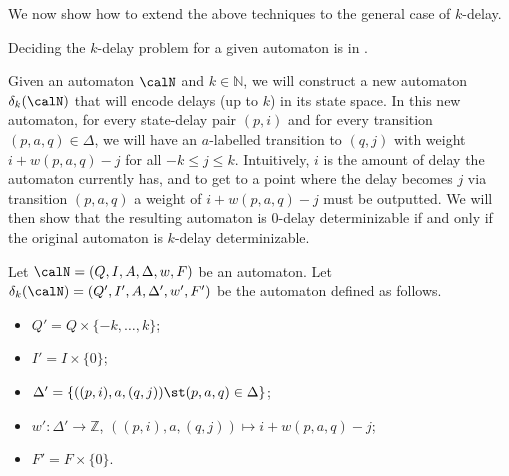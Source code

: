 \documentclass[a4paper]{article}
\begin{document}
We now show how to extend the above techniques to the general case of
$k$-delay.

\begin{theorem}\label{thm:kdelay-in-exp}
	Deciding the $k$-delay problem for a given automaton is in
	\EXP.
\end{theorem}

Given an automaton $\calN$ and $k \in \mathbb{N}$, we will construct a new automaton
$\delta_k(\calN)$ that will encode delays (up to $k$) in its state space. In this new
automaton, for every state-delay pair $(p,i)$ and for every transition
$(p,a,q) \in \Delta$, we will have an $a$-labelled transition to $(q,j)$ with
weight $i + w(p,a,q) - j$ for all $-k \le j \le k$. Intuitively, $i$ is the
amount of delay the automaton currently has, and to get to a point where the
delay becomes $j$ via transition $(p,a,q)$ a weight of $i + w(p,a,q) - j$ must
be outputted.  We will then show that the resulting automaton is $0$-delay
determinizable if and only if the original automaton is $k$-delay
determinizable.

Let $\calN =  (Q, I, A, \Delta, w,F)$ be an automaton.
Let $\delta_k(\calN) =  (Q', I', A, \Delta',w',F')$ be the
automaton defined as follows.
\begin{itemize}[nolistsep]
	\item $Q' = Q \times \{ -k, \dots, k \}$;
	\item $I'= I \times \{0\}$;
	\item $\Delta' = \{ ((p,i), a, (q,j)) \st (p, a, q) \in \Delta \}$;
	\item $w' : \Delta' \rightarrow \mathbb{Z}$, $((p,i), a, (q,j))
		\mapsto i + w(p,a,q) - j$;
	\item $F' = F \times \{ 0 \}$.
\end{itemize}
\end{document}
